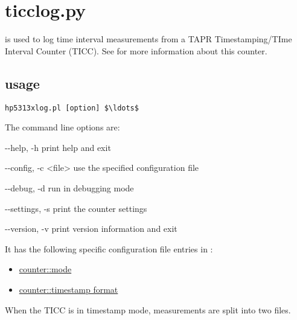\section{ticclog.py}
\hypertarget{h:ticclog}{}

 is used to log time interval measurements from a TAPR Timestamping/TIme Interval Counter (TICC).
See  for more information about this counter.

\subsection{usage}

\begin{lstlisting}[mathescape=true]
hp5313xlog.pl [option] $\ldots$ 
\end{lstlisting}

The command line options are:
\begin{description*}
 \item[-{}-help, -h] print help and exit
 \item[-{}-config, -c  \textless{file}\textgreater] use the specified configuration file
 \item[-{}-debug, -d]           run in debugging mode
 \item[-{}-settings, -s]        print the counter settings
  \item[-{}-version, -v]        print version information and exit
\end{description*}

It has the following specific configuration file entries in :
\begin{itemize}
	\item \hyperlink{h:counter_mode}{counter::mode}
	\item \hyperlink{h:counter_timestamp_format}{counter::timestamp format}
\end{itemize}

When the TICC is in timestamp mode, measurements are split into two files.
